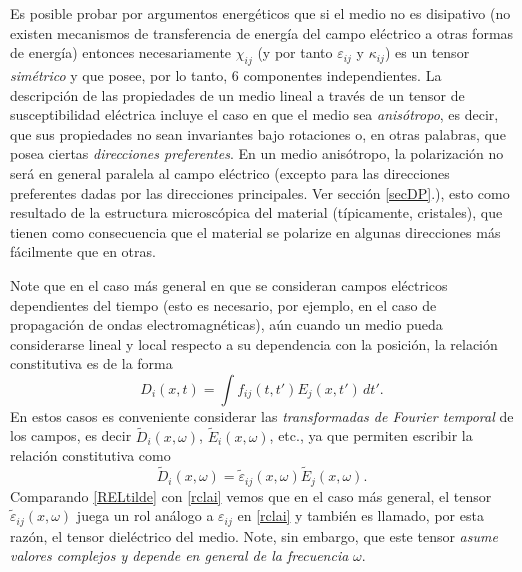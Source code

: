 Es posible probar por
argumentos energéticos que si el medio no es disipativo (no existen mecanismos
de transferencia de energía del campo eléctrico a otras formas de energía)
entonces necesariamente $\chi_{ij}$ (y por tanto $\varepsilon_{ij}$ y
$\kappa_{ij}$) es un tensor \textit{simétrico} y que posee, por lo
tanto, 6 componentes independientes. La descripción de las
propiedades de un medio lineal a través de un tensor de susceptibilidad
eléctrica incluye el caso en que el medio sea \textit{anisótropo}, es decir,
que sus propiedades no sean invariantes bajo rotaciones o, en otras palabras,
que posea ciertas \textit{direcciones preferentes}. En un medio anisótropo, la
polarización no será en general paralela al campo eléctrico (excepto para las
direcciones preferentes dadas por las direcciones principales. Ver sección
\ref{secDP}.), esto como
resultado de la estructura microscópica del material (típicamente, cristales),
que tienen como consecuencia que el material se polarize en algunas direcciones
más fácilmente que en otras.


Note que en el caso más general en que se consideran campos eléctricos dependientes del tiempo (esto es necesario, por ejemplo, en el caso de propagación de ondas electromagnéticas), aún cuando un medio pueda considerarse lineal y local respecto a su dependencia con la posición, la relación constitutiva es de la forma
\begin{equation}
D_i(x,t)=\int f_{ij}(t,t')E_j(x,t')\,dt'.
\end{equation}
En estos casos es conveniente considerar las \textit{transformadas de Fourier temporal} de los campos, es decir $\tilde{D}_i(x,\omega)$, $\tilde{E}_i(x,\omega)$, etc., ya que permiten escribir la relación constitutiva como
\begin{equation}\label{RELtilde}
\tilde{D}_i(x,\omega)=\tilde{\varepsilon}_{ij}(x,\omega)\tilde{E}_j(x,\omega). 
\end{equation}
Comparando \eqref{RELtilde} con \eqref{rclai} vemos que en el caso más general, el tensor $\tilde{\varepsilon}_{ij}(x,\omega)$ juega un rol análogo a $\varepsilon_{ij}$ en \eqref{rclai} y también es llamado, por esta razón, el tensor dieléctrico del medio. Note, sin embargo, que este tensor \textit{asume valores complejos y depende en general de la frecuencia} $\omega$.


